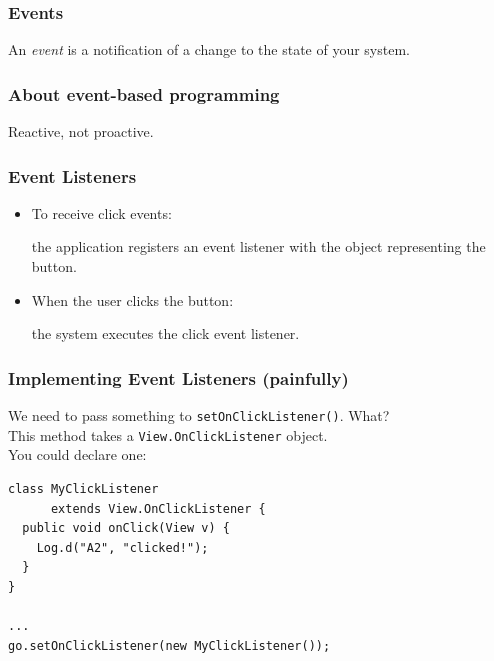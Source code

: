 \begin{frame}
\frametitle{Events}

\begin{changemargin}{2.5cm}
\Large
An \emph{event} is a notification of a change to the state of your system.
\end{changemargin}

\end{frame}

\begin{frame}
\frametitle{About event-based programming}

\begin{changemargin}{2.5cm}
\begin{itemize}
\Large Reactive, not proactive.
\end{itemize}
\end{changemargin}

\end{frame}

\begin{frame}
\frametitle{Event Listeners}

\begin{changemargin}{1.5cm}
\begin{itemize}
\item To receive click events: \\
\begin{changemargin}{1em}
the application registers an event 
listener with the object representing the button.\\
\end{changemargin}
\item When the user clicks the button: \\
\begin{changemargin}{1em}
the system executes the click event listener.
\end{changemargin}
\end{itemize}
\end{changemargin}

\end{frame}


\begin{frame}[fragile]
\frametitle{Implementing Event Listeners (painfully)}

\begin{changemargin}{1.5cm}
We need to pass something to {\tt setOnClickListener()}. What?\\[1em]

This method takes a {\tt View.OnClickListener} object.\\[1em]

You could declare one:

{\small
\begin{verbatim}
class MyClickListener 
      extends View.OnClickListener {
  public void onClick(View v) {
    Log.d("A2", "clicked!");
  }
}

...
go.setOnClickListener(new MyClickListener()); 
\end{verbatim}
}

\end{changemargin}

\end{frame}

